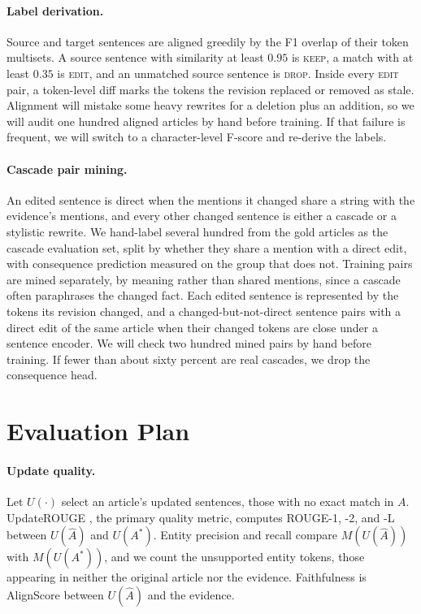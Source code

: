 \documentclass[11pt]{article}
\newcommand{\keep}{\textsc{keep}}
\newcommand{\edit}{\textsc{edit}}
\newcommand{\drop}{\textsc{drop}}
\begin{document}
\paragraph{Label derivation.}
Source and target sentences are aligned greedily by the F1 overlap of their token multisets. A source sentence with similarity at least $0.95$ is \keep{}, a match with at least $0.35$ is \edit{}, and an unmatched source sentence is \drop{}. Inside every \edit{} pair, a token-level diff marks the tokens the revision replaced or removed as stale. Alignment will mistake some heavy rewrites for a deletion plus an addition, so we will audit one hundred aligned articles by hand before training. If that failure is frequent, we will switch to a character-level F-score and re-derive the labels.

\paragraph{Cascade pair mining.}
An edited sentence is direct when the mentions it changed share a string with the evidence's mentions, and every other changed sentence is either a cascade or a stylistic rewrite. We hand-label several hundred from the gold articles as the cascade evaluation set, split by whether they share a mention with a direct edit, with consequence prediction measured on the group that does not. Training pairs are mined separately, by meaning rather than shared mentions, since a cascade often paraphrases the changed fact. Each edited sentence is represented by the tokens its revision changed, and a changed-but-not-direct sentence pairs with a direct edit of the same article when their changed tokens are close under a sentence encoder. We will check two hundred mined pairs by hand before training. If fewer than about sixty percent are real cascades, we drop the consequence head.

\section{Evaluation Plan}
\label{sec:eval}

\paragraph{Update quality.}
Let $U(\cdot)$ select an article's updated sentences, those with no exact match in $A$. UpdateROUGE \citep{iv-etal-2022-fruit}, the primary quality metric, computes ROUGE-1, -2, and -L between $U(\hat{A})$ and $U(A^\ast)$. Entity precision and recall compare $M(U(\hat{A}))$ with $M(U(A^\ast))$, and we count the unsupported entity tokens, those appearing in neither the original article nor the evidence. Faithfulness is AlignScore \citep{zha-etal-2023-alignscore} between $U(\hat{A})$ and the evidence.
\end{document}
